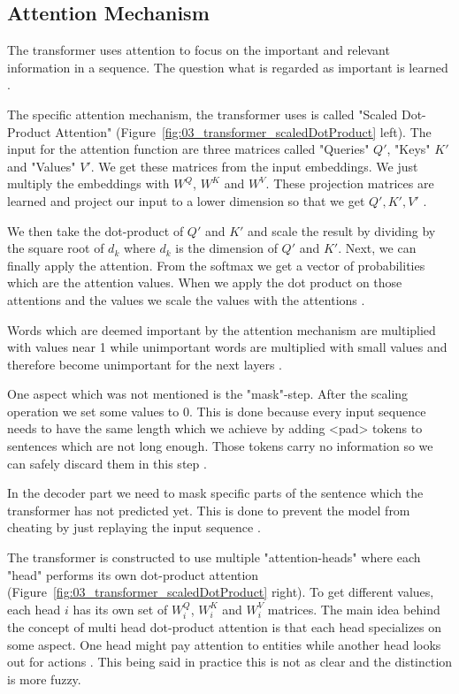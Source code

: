 \subsection{Attention Mechanism}

The transformer uses attention to focus on the important and relevant information in a sequence. The question what is regarded as important is learned \cite{Vaswani2017d}.

The specific attention mechanism, the transformer uses is called "Scaled Dot-Product Attention" {(Figure~\ref{fig:03_transformer_scaledDotProduct} left)}. The input for the attention function are three matrices called "Queries" $Q'$, "Keys" $K'$ and "Values" $V'$. We get these matrices from the input embeddings. We just multiply the embeddings with $W^Q$, $W^K$ and $W^V$. These projection matrices are learned and project our input to a lower dimension so that we get $Q', K', V'$ \cite{Vaswani2017d}.
\bigskip

We then take the dot-product of $Q'$ and $K'$ and scale the result by dividing by the square root of $d_k$ where $d_k$ is the dimension of $Q'$ and $K'$. Next, we can finally apply the attention. From the softmax we get a vector of probabilities which are the attention values. When we apply the dot product on those attentions and the values we scale the values with the attentions \cite{Vaswani2017d}. 
\medskip

Words which are deemed important by the attention mechanism are multiplied with values near 1 while unimportant words are multiplied with small values and therefore become unimportant for the next layers \cite{Vaswani2017d}.
\medskip

One aspect which was not mentioned is the "mask"-step. After the scaling operation we set some values to 0. This is done because every input sequence needs to have the same length which we achieve by adding <pad> tokens to sentences which are not long enough. Those tokens carry no information so we can safely discard them in this step \cite{Vaswani2017d}. 

In the decoder part we need to mask specific parts of the sentence which the transformer has not predicted yet. This is done to prevent the model from cheating by just replaying the input sequence \cite{Vaswani2017d}.
\medskip

The transformer is constructed to use multiple "attention-heads" where each "head" performs its own dot-product attention {(Figure~\ref{fig:03_transformer_scaledDotProduct} right)}. To get different values, each head $i$ has its own set of $W_i^Q$, $W_i^K$ and $W_i^V$ matrices. The main idea behind the concept of multi head dot-product attention is that each head specializes on some aspect. One head might pay attention to entities while another head looks out for actions \cite{Vaswani2017d}. This being said in practice this is not as clear and the distinction is more fuzzy.

